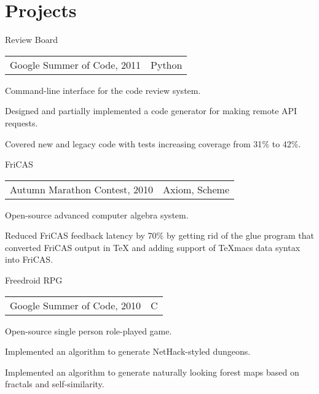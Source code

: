 \documentclass[a4paper]{article}
\begin{document}
	\section{Projects}
	\begin{multicols}{2}
		\raggedcolumns
		\begin{project2}{Review Board}{\begin{tabular}{@{}l|l}Google Summer of Code, 2011 & Python\\\end{tabular}}
			Command-line interface for the code review system.
			\begin{items}
				\item Designed and partially implemented a code generator for making remote API requests.
				\item Covered new and legacy code with tests increasing coverage from 31$\%$ to 42$\%$.
			\end{items}
		\end{project2}

		\begin{project2}{FriCAS}{\begin{tabular}{@{}l|l}Autumn Marathon Contest, 2010 & Axiom, Scheme\\\end{tabular}}
			Open-source advanced computer algebra system.
			\begin{items}
				\item Reduced FriCAS feedback latency by 70$\%$ by getting rid of the glue program that converted FriCAS output in \TeX{} and adding support of TeXmacs data syntax into FriCAS.
			\end{items}
		\end{project2}

		\columnbreak

		\begin{project2}{Freedroid RPG}{\begin{tabular}{@{}l|l}Google Summer of Code, 2010 & C\\\end{tabular}}
			Open-source single person role-played game.
			\begin{items}
				\item Implemented an algorithm to generate NetHack-styled dungeons.
				\item Implemented an algorithm to generate naturally looking forest maps based on fractals and self-similarity.
			\end{items}
		\end{project2}


\end{multicols}
\end{document}
